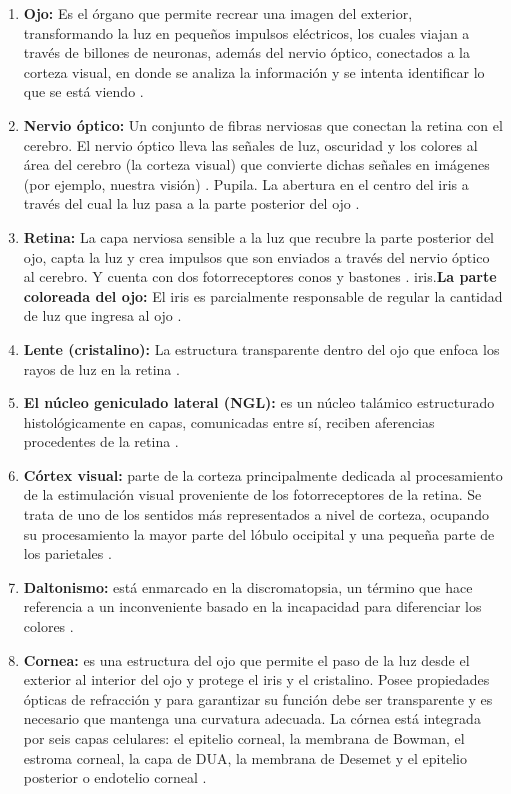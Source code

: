 \documentclass[10pt]{article}
\begin{document}
\begin{enumerate}
\item \textbf{Ojo:} Es el órgano que permite recrear una imagen del exterior, transformando la luz en pequeños impulsos eléctricos, los cuales viajan a través de billones de neuronas, además del nervio óptico, conectados a la corteza visual, en donde se analiza la información y se intenta identificar lo que se está viendo \cite{IEEEreferencias:Ref34}. 
\item \textbf{Nervio óptico:} Un conjunto de fibras nerviosas que conectan la retina con el cerebro. El nervio óptico lleva las señales de luz, oscuridad y los colores al área del cerebro (la corteza visual) que convierte dichas señales en imágenes (por ejemplo, nuestra visión) \cite{IEEEreferencias:Ref35}.
Pupila. La abertura en el centro del iris a través del cual la luz pasa a la parte posterior del ojo \cite{IEEEreferencias:Ref35}. 
\item \textbf{Retina:} La capa nerviosa sensible a la luz que recubre la parte posterior del ojo, capta la luz y crea impulsos que son enviados a través del nervio óptico al cerebro. Y cuenta con dos fotorreceptores conos y bastones \cite{IEEEreferencias:Ref35}. 
iris.\textbf{La parte coloreada del ojo:} El iris es parcialmente responsable de regular la cantidad de luz que ingresa al ojo \cite{IEEEreferencias:Ref35}. 
\item \textbf{Lente (cristalino):} La estructura transparente dentro del ojo que enfoca los rayos de luz en la retina \cite{IEEEreferencias:Ref35}. 
\item \textbf{El núcleo geniculado lateral (NGL):} es un núcleo talámico estructurado histológicamente en capas, comunicadas entre sí, reciben aferencias procedentes de la retina \cite{IEEEreferencias:Ref36}. 
\item \textbf{Córtex visual:} parte de la corteza principalmente dedicada al procesamiento de la estimulación visual proveniente de los fotorreceptores de la retina. Se trata de uno de los sentidos más representados a nivel de corteza, ocupando su procesamiento la mayor parte del lóbulo occipital y una pequeña parte de los parietales \cite{IEEEreferencias:Ref37}. 
\item \textbf{Daltonismo:} está enmarcado en la discromatopsia, un término que hace referencia a un inconveniente basado en la incapacidad para diferenciar los colores \cite{IEEEreferencias:Ref1}. 
\item \textbf{Cornea:} es una estructura del ojo que permite el paso de la luz desde el exterior al interior del ojo y protege el iris y el cristalino. Posee propiedades ópticas de refracción y para garantizar su función debe ser transparente y es necesario que mantenga una curvatura adecuada. La córnea está integrada por seis capas celulares: el epitelio corneal, la membrana de Bowman, el estroma corneal, la capa de DUA, la membrana de Desemet y el epitelio posterior o endotelio corneal \cite{IEEEreferencias:Ref6}.

\end{enumerate}
\end{document}
